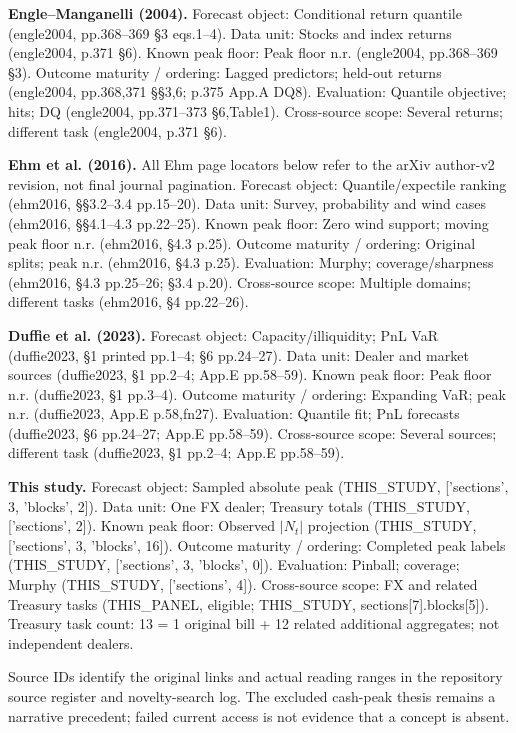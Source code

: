\documentclass[11pt,a4paper]{article}
\begin{document}
\textbf{Engle--Manganelli (2004).} Forecast object: Conditional return quantile (engle2004, pp.368--369 §3 eqs.1--4). Data unit: Stocks and index returns (engle2004, p.371 §6). Known peak floor: Peak floor n.r. (engle2004, pp.368--369 §3). Outcome maturity / ordering: Lagged predictors; held-out returns (engle2004, pp.368,371 §§3,6; p.375 App.A DQ8). Evaluation: Quantile objective; hits; DQ (engle2004, pp.371--373 §6,Table1). Cross-source scope: Several returns; different task (engle2004, p.371 §6).

\textbf{Ehm et al. (2016).} All Ehm page locators below refer to the arXiv author-v2 revision, not final journal pagination. Forecast object: Quantile/expectile ranking (ehm2016, §§3.2--3.4 pp.15--20). Data unit: Survey, probability and wind cases (ehm2016, §§4.1--4.3 pp.22--25). Known peak floor: Zero wind support; moving peak floor n.r. (ehm2016, §4.3 p.25). Outcome maturity / ordering: Original splits; peak n.r. (ehm2016, §4.3 p.25). Evaluation: Murphy; coverage/sharpness (ehm2016, §4.3 pp.25--26; §3.4 p.20). Cross-source scope: Multiple domains; different tasks (ehm2016, §4 pp.22--26).

\textbf{Duffie et al. (2023).} Forecast object: Capacity/illiquidity; PnL VaR (duffie2023, §1 printed pp.1--4; §6 pp.24--27). Data unit: Dealer and market sources (duffie2023, §1 pp.2--4; App.E pp.58--59). Known peak floor: Peak floor n.r. (duffie2023, §1 pp.3--4). Outcome maturity / ordering: Expanding VaR; peak n.r. (duffie2023, App.E p.58,fn27). Evaluation: Quantile fit; PnL forecasts (duffie2023, §6 pp.24--27; App.E pp.58--59). Cross-source scope: Several sources; different task (duffie2023, §1 pp.2--4; App.E pp.58--59).

\textbf{This study.} Forecast object: Sampled absolute peak (THIS\_STUDY, ['sections', 3, 'blocks', 2]). Data unit: One FX dealer; Treasury totals (THIS\_STUDY, ['sections', 2]). Known peak floor: Observed \(|N_t|\) projection (THIS\_STUDY, ['sections', 3, 'blocks', 16]). Outcome maturity / ordering: Completed peak labels (THIS\_STUDY, ['sections', 3, 'blocks', 0]). Evaluation: Pinball; coverage; Murphy (THIS\_STUDY, ['sections', 4]). Cross-source scope: FX and related Treasury tasks (THIS\_PANEL, eligible; THIS\_STUDY, sections[7].blocks[5]). Treasury task count: 13 = 1 original bill + 12 related additional aggregates; not independent dealers.

Source IDs identify the original links and actual reading ranges in the repository source register and novelty-search log. The excluded cash-peak thesis remains a narrative precedent; failed current access is not evidence that a concept is absent.
\end{document}
